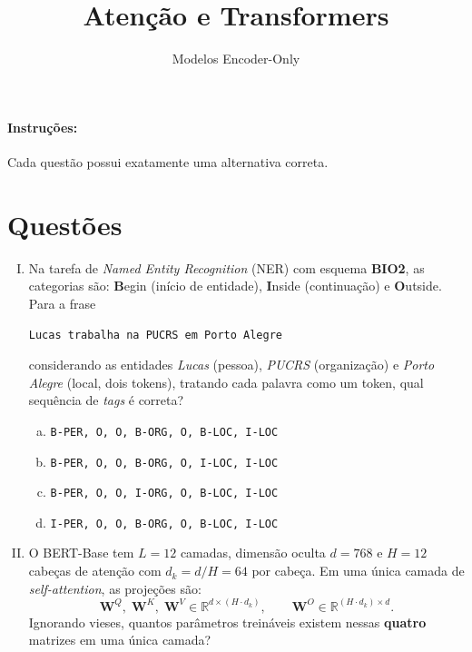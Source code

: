 \documentclass{dlproblemset}
\title{Atenção e Transformers}
\subtitle{Modelos Encoder-Only}
\begin{document}
\paragraph{Instruções:} Cada questão possui exatamente uma alternativa correta.

\section*{Questões}

\begin{enumerate}[I)]

\item Na tarefa de \textit{Named Entity Recognition} (NER) com esquema
      \textbf{BIO2}, as categorias são: \textbf{B}egin (início de entidade),
      \textbf{I}nside (continuação) e \textbf{O}utside. Para a frase

\begin{center}
  \texttt{Lucas trabalha na PUCRS em Porto Alegre}
\end{center}

considerando as entidades \textit{Lucas} (pessoa), \textit{PUCRS} (organização)
e \textit{Porto Alegre} (local, dois tokens), tratando cada palavra como um token, qual sequência de
\textit{tags} é correta?

\begin{enumerate}[a)]
    \item \texttt{B-PER, O, O, B-ORG, O, B-LOC, I-LOC}
    \item \texttt{B-PER, O, O, B-ORG, O, I-LOC, I-LOC}
    \item \texttt{B-PER, O, O, I-ORG, O, B-LOC, I-LOC}
    \item \texttt{I-PER, O, O, B-ORG, O, B-LOC, I-LOC}
\end{enumerate}

\item O BERT-Base tem $L = 12$ camadas, dimensão oculta $d = 768$ e
      $H = 12$ cabeças de atenção com $d_k = d/H = 64$ por cabeça.
      Em uma única camada de \textit{self-attention}, as projeções são:
      \[
        \mathbf{W}^Q,\; \mathbf{W}^K,\; \mathbf{W}^V \in \mathbb{R}^{d \times (H \cdot d_k)},
        \qquad
        \mathbf{W}^O \in \mathbb{R}^{(H \cdot d_k) \times d}.
      \]
      Ignorando vieses, quantos parâmetros treináveis existem nessas
      \textbf{quatro} matrizes em uma única camada?


\end{enumerate}
\end{document}
